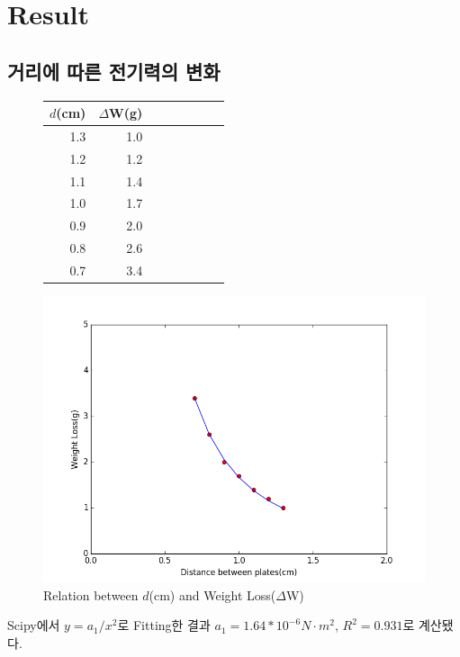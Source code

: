 \documentclass[a4paper, 8pt]{article}
\begin{document}
\newpage

\section{Result}
	\subsection{거리에 따른 전기력의 변화}
	\vspace{-6.5mm}
	\begin{figure}[h]
		\centering
		\begin{minipage}{.27\textwidth}
			\centering
			\begin{tabular}{rrrrrrrr}
			\hline \hline
			$d$(\si{cm}) & $\Delta${}W(\si{g}) \\
			\hline
			1.3 & 1.0 \\
			\hline
			1.2 & 1.2 \\
			\hline
			1.1 & 1.4 \\
			\hline
			1.0 & 1.7 \\
			\hline
			0.9 & 2.0 \\
			\hline
			0.8 & 2.6 \\
			\hline
			0.7 & 3.4 \\
			\hline \hline
			\end{tabular}
		\end{minipage}
		\begin{minipage}{.7\textwidth}
			\includegraphics[width=\textwidth]{img/figure_1.png}
		\end{minipage}
		\caption{Relation between $d$(\si{cm}) and Weight Loss($\Delta$W)}
	\end{figure}
	Scipy에서 $y=a_{1}/{x^2}$로 Fitting한 결과 $a_{1}=1.64*10^{-6}\si{N\cdot{}m^{2}}$, $R^2=0.931$로 계산됐다.
\end{document}
